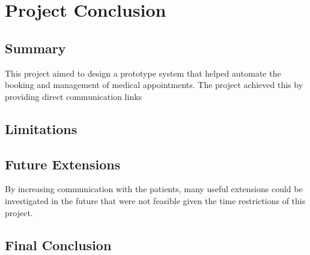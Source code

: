 
\chapter{Project Conclusion} %

\label{Chapter7} %


\section{Summary}

This project aimed to design a prototype system that helped automate the booking and management of medical appointments. The project achieved this by providing direct communication links

\section{Limitations}

\section{Future Extensions}

By increasing communication with the patients, many useful extensions could be investigated in the future that were not feasible given the time restrictions of this project.

\section{Final Conclusion}

